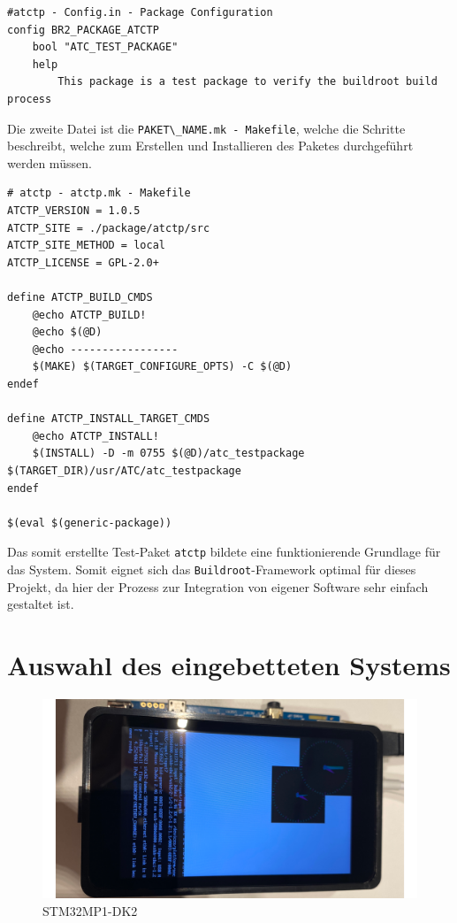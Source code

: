 \begin{lstlisting}
#atctp - Config.in - Package Configuration
config BR2_PACKAGE_ATCTP
    bool "ATC_TEST_PACKAGE"
    help
        This package is a test package to verify the buildroot build process
\end{lstlisting}

Die zweite Datei ist die
\passthrough{\lstinline!PAKET\_NAME.mk - Makefile!}, welche die Schritte
beschreibt, welche zum Erstellen und Installieren des Paketes
durchgeführt werden müssen.

\begin{lstlisting}
# atctp - atctp.mk - Makefile
ATCTP_VERSION = 1.0.5
ATCTP_SITE = ./package/atctp/src
ATCTP_SITE_METHOD = local
ATCTP_LICENSE = GPL-2.0+

define ATCTP_BUILD_CMDS
    @echo ATCTP_BUILD!
    @echo $(@D)
    @echo -----------------
    $(MAKE) $(TARGET_CONFIGURE_OPTS) -C $(@D)
endef

define ATCTP_INSTALL_TARGET_CMDS
    @echo ATCTP_INSTALL!
    $(INSTALL) -D -m 0755 $(@D)/atc_testpackage $(TARGET_DIR)/usr/ATC/atc_testpackage
endef

$(eval $(generic-package))
\end{lstlisting}

Das somit erstellte Test-Paket \passthrough{\lstinline!atctp!} bildete
eine funktionierende Grundlage für das System. Somit eignet sich das
\passthrough{\lstinline!Buildroot!}-Framework optimal für dieses
Projekt, da hier der Prozess zur Integration von eigener Software sehr
einfach gestaltet ist.

\hypertarget{auswahl-des-eingebetteten-systems}{%
\section{Auswahl des eingebetteten
Systems}\label{auswahl-des-eingebetteten-systems}}

\begin{figure}
\centering
\includegraphics{images/stm32mp1.png}
\caption{STM32MP1-DK2 \label{stm32mp1}}
\end{figure}

